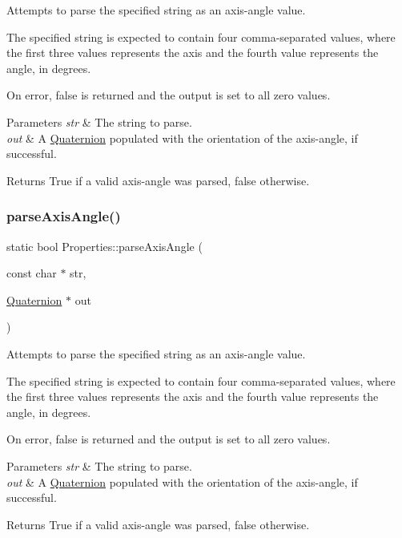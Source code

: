 Attempts to parse the specified string as an axis-\/angle value.

The specified string is expected to contain four comma-\/separated values, where the first three values represents the axis and the fourth value represents the angle, in degrees.

On error, false is returned and the output is set to all zero values.


\begin{DoxyParams}{Parameters}
{\em str} & The string to parse. \\
\hline
{\em out} & A \hyperlink{classQuaternion}{Quaternion} populated with the orientation of the axis-\/angle, if successful.\\
\hline
\end{DoxyParams}
\begin{DoxyReturn}{Returns}
True if a valid axis-\/angle was parsed, false otherwise. 
\end{DoxyReturn}
\mbox{\label{classProperties_a5dacddae83ef40b695fb23f297cdc277}} 
\subsubsection{\texorpdfstring{parse\+Axis\+Angle()}{parseAxisAngle()}\hspace{0.1cm}{\footnotesize\ttfamily [2/2]}}
{\footnotesize\ttfamily static bool Properties\+::parse\+Axis\+Angle (\begin{DoxyParamCaption}\item[{const char $\ast$}]{str,  }\item[{\hyperlink{classQuaternion}{Quaternion} $\ast$}]{out }\end{DoxyParamCaption})\hspace{0.3cm}{\ttfamily [static]}}

Attempts to parse the specified string as an axis-\/angle value.

The specified string is expected to contain four comma-\/separated values, where the first three values represents the axis and the fourth value represents the angle, in degrees.

On error, false is returned and the output is set to all zero values.


\begin{DoxyParams}{Parameters}
{\em str} & The string to parse. \\
\hline
{\em out} & A \hyperlink{classQuaternion}{Quaternion} populated with the orientation of the axis-\/angle, if successful.\\
\hline
\end{DoxyParams}
\begin{DoxyReturn}{Returns}
True if a valid axis-\/angle was parsed, false otherwise. 
\end{DoxyReturn}
\mbox{\label{classProperties_a1624834d48cae395789b70fe444043ac}} 
